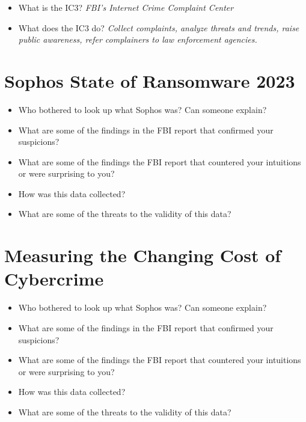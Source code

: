 \documentclass[11pt]{article}
\begin{document}
\begin{itemize}
    \item What is the IC3? {\it FBI's Internet Crime Complaint Center}
    \item What does the IC3 do? {\it Collect complaints, analyze threats and trends, raise public awareness, refer complainers to law enforcement agencies.}
\end{itemize}

\section*{Sophos State of Ransomware 2023}

\begin{itemize}
    \item Who bothered to look up what Sophos was? Can someone explain?
    \item What are some of the findings in the FBI report that confirmed your suspicions?
    \item What are some of the findings the FBI report that countered your intuitions or were surprising to you? 
    \item How was this data collected?
    \item What are some of the threats to the validity of this data?
\end{itemize}

\section*{Measuring the Changing Cost of Cybercrime}

\begin{itemize}
    \item Who bothered to look up what Sophos was? Can someone explain?
    \item What are some of the findings in the FBI report that confirmed your suspicions?
    \item What are some of the findings the FBI report that countered your intuitions or were surprising to you? 
    \item How was this data collected?
    \item What are some of the threats to the validity of this data?
\end{itemize}
\end{document}
